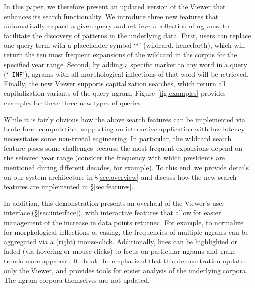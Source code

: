 \documentclass[11pt]{article}
\newcommand{\query}[1]{\texttt{#1}}
\begin{document}
In this paper, we therefore present an updated version of the Viewer that enhances its search functionality. We introduce three new features that automatically expand a given query and retrieve a collection of ngrams, to facilitate the discovery of patterns in the underlying data. First, users can replace one query term with a placeholder symbol `\query{*}' (wildcard, henceforth), which will return the ten most frequent expansions of the wildcard in the corpus for the specified year range. 
Second, by adding a specific marker to any word in a query (`\query{\_INF}'), ngrams with all morphological inflections of that word will be retrieved. 
Finally, the new Viewer supports capitalization searches, which return all capitalization variants of the query ngram. Figure~\ref{fig:examples} provides examples for these three new types of queries.

While it is fairly obvious how the above search features can be implemented via brute-force computation, supporting an interactive application with low latency necessitates some non-trivial engineering. In particular, the wildcard search feature poses some challenges because the most frequent expansions depend on the selected year range (consider the frequency with which presidents are mentioned during different decades, for example). To this end, we provide details on our system architecture in \S\ref{sec:overview}  and discuss how the new search features are implemented in \S\ref{sec:features}.

In addition, this demonstration presents an overhaul of the Viewer's user interface (\S\ref{sec:interface}), with interactive features that allow for easier management of the increase in data points returned. For example, to normalize for morphological inflections or casing, the frequencies of multiple ngrams can be aggregated via a (right) mouse-click. Additionally, lines can be highlighted or faded (via hovering or mouse-clicks) to focus on particular ngrams and make trends more apparent. It should be emphasized that this demonstration updates only the Viewer, and provides tools for easier analysis of the underlying corpora. The ngram corpora themselves are not updated.
\end{document}
